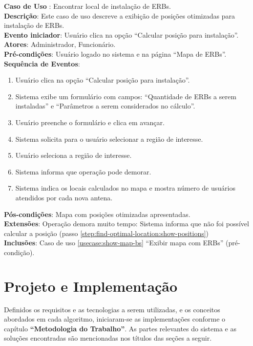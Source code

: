 \documentclass[]{politex}
\newcommand*\NewPage{\newpage\null\thispagestyle{empty}\newpage}
\begin{document}
\noindent \textbf{Caso de Uso }: Encontrar local
de instalação de ERBs. \\
\textbf{Descrição}: Este caso de uso descreve a exibição de posições otimizadas
para instalação de ERBs. \\
\textbf{Evento iniciador}: Usuário clica na opção ``Calcular posição para
instalação''. \\
\textbf{Atores}: Administrador, Funcionário. \\
\textbf{Pré-condições}: Usuário logado no sistema e na página ``Mapa de
ERBs''. \\
\textbf{Sequência de Eventos}:
\begin{enumerate}
\item Usuário clica na opção ``Calcular posição para instalação''.
\item Sistema exibe um formulário com campos: ``Quantidade de ERBs a serem
instaladas'' e ``Parâmetros a serem considerados no cálculo''.
\item Usuário preenche o formulário e clica em avançar.
\item Sistema solicita para o usuário selecionar a região de interesse.
\item Usuário seleciona a região de interesse.
\item Sistema informa que operação pode demorar.
\item\label{step:find-optimal-location:show-positions} Sistema indica os locais
calculados no mapa e mostra número de usuários atendidos por cada nova antena.
\end{enumerate}
\textbf{Pós-condições}: Mapa com posições otimizadas apresentadas. \\
\textbf{Extensões}: Operação demora muito tempo: Sistema informa que não foi
possível calcular a posição (passo
\ref{step:find-optimal-location:show-positions}) \\
\textbf{Inclusões}: Caso de uso \ref{usecase:show-map-bs} ``Exibir mapa com
ERBs'' (pré-condição). \\

\NewPage
\chapter{Projeto e Implementação}

Definidos os requisitos e as tecnologias a serem utilizadas, e os conceitos
abordados em cada algoritmo, iniciaram-se as implementações conforme o capítulo
\textbf{``Metodologia do Trabalho''}. As partes relevantes do sistema e as
soluções encontradas são mencionadas nos títulos das seções a seguir.
\end{document}
